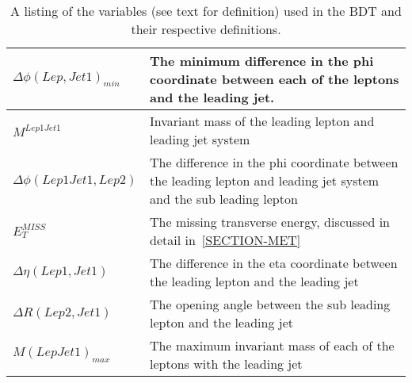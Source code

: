 \begin{table}[phtb]
\begin{center}
\begin{tabular}{|m{5cm}|m{10cm}|}
 $\Delta \phi (Lep,Jet1)_{min}$         &  The minimum difference in the phi coordinate between each of the leptons and the leading jet. \\\hline
 $M^{Lep1Jet1}$                         &  Invariant mass of the leading lepton and leading jet system \\\hline
 $\Delta \phi (Lep1Jet1,Lep2)$          &  The difference in the phi coordinate between the leading lepton and leading jet system and the sub leading lepton \\\hline
 $E_T^{MISS}$                           &  The missing transverse energy, discussed in detail in~\ref{SECTION-MET} \\\hline
 $\Delta\eta (Lep1,Jet1)$               &  The difference in the eta coordinate between the leading lepton and the leading jet \\\hline
 $\Delta R(Lep2,Jet1)$                  &  The opening angle between the sub leading lepton and the leading jet \\\hline
 $M(LepJet1)_{max}$                    &  The maximum invariant mass of each of the leptons with the leading jet  \\\hline
      \hline\hline
    \end{tabular}
    \caption{A listing of the variables (see text for definition) used in the BDT and their respective definitions.}
    \label{TABLE-BDT-VARIABLE-DEFS}
  \end{center}
\end{table}
